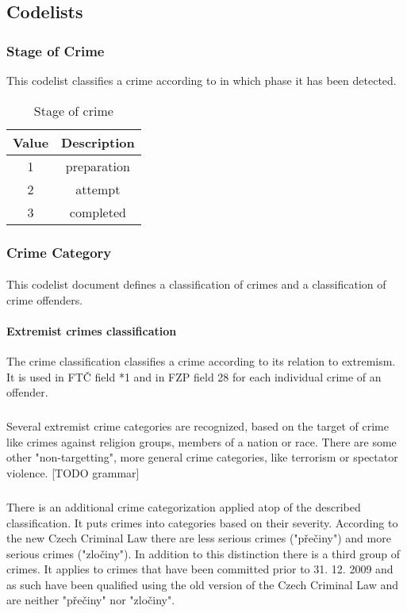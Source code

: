 \subsection{Codelists}
\subsubsection{Stage of Crime}
This codelist classifies a crime according to in which phase it has been detected.

\begin{table}[!hbtp]
\begin{tabular}{|c|c|}
\hline
\textbf{Value}&\textbf{Description} \\
\hline
1 & preparation \\
\hline
2 & attempt \\
\hline
3 & completed \\
\hline
\end{tabular}
\caption{Stage of crime}
\label{table:codelist_stage_of_crime}
\end{table}

\subsubsection{Crime Category}\label{sec:crime_category}
\paragraph{}
This codelist document defines a classification of crimes and a classification of crime offenders.
\paragraph{Extremist crimes classification} The crime classification classifies a crime according to its relation to extremism.
It is used in FTČ field *1 and in FZP field 28 for each individual crime of an offender.
\subparagraph{}Several extremist crime categories are recognized, based on the target of crime like crimes against religion groups, members of a nation or race. There are some other "non-targetting", more general crime categories, like terrorism or spectator violence. [TODO grammar]
\subparagraph{}There is an additional crime categorization applied atop of the described classification. It puts crimes into categories based on their severity.
According to the new Czech Criminal Law there are less serious crimes ("přečiny") and more serious crimes ("zločiny"). In addition to this distinction there is a third group of crimes. It applies to crimes that have been committed prior to 31. 12. 2009 and as such have been qualified using the old version of the Czech Criminal Law and are neither "přečiny" nor "zločiny".

